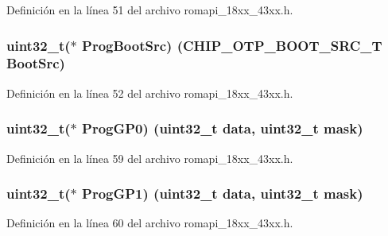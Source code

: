 Definición en la línea 51 del archivo romapi\+\_\+18xx\+\_\+43xx.\+h.

\subsubsection[{\texorpdfstring{Prog\+Boot\+Src}{ProgBootSrc}}]{\setlength{\rightskip}{0pt plus 5cm}uint32\+\_\+t($\ast$ Prog\+Boot\+Src) ({\bf C\+H\+I\+P\+\_\+\+O\+T\+P\+\_\+\+B\+O\+O\+T\+\_\+\+S\+R\+C\+\_\+T} Boot\+Src)}\hypertarget{struct_o_t_p___a_p_i___t_a5d8400d1ec09241959b5e048826c4ae8}{}\label{struct_o_t_p___a_p_i___t_a5d8400d1ec09241959b5e048826c4ae8}


Definición en la línea 52 del archivo romapi\+\_\+18xx\+\_\+43xx.\+h.

\subsubsection[{\texorpdfstring{Prog\+G\+P0}{ProgGP0}}]{\setlength{\rightskip}{0pt plus 5cm}uint32\+\_\+t($\ast$ Prog\+G\+P0) (uint32\+\_\+t data, uint32\+\_\+t mask)}\hypertarget{struct_o_t_p___a_p_i___t_a9e871dbff88dbe9f4a3a3bd71de39d0c}{}\label{struct_o_t_p___a_p_i___t_a9e871dbff88dbe9f4a3a3bd71de39d0c}


Definición en la línea 59 del archivo romapi\+\_\+18xx\+\_\+43xx.\+h.

\subsubsection[{\texorpdfstring{Prog\+G\+P1}{ProgGP1}}]{\setlength{\rightskip}{0pt plus 5cm}uint32\+\_\+t($\ast$ Prog\+G\+P1) (uint32\+\_\+t data, uint32\+\_\+t mask)}\hypertarget{struct_o_t_p___a_p_i___t_a44974e1eceadf104ae5d8c02a2b0864c}{}\label{struct_o_t_p___a_p_i___t_a44974e1eceadf104ae5d8c02a2b0864c}


Definición en la línea 60 del archivo romapi\+\_\+18xx\+\_\+43xx.\+h.


